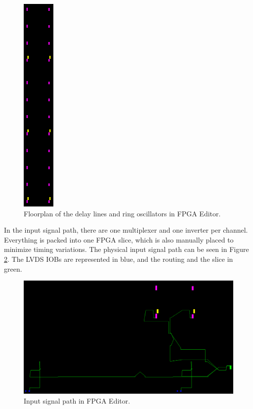 \documentclass[a4paper,11pt]{article}
\begin{document}
\begin{figure}[h]
\centering
\includegraphics[width=1.6cm]{floorplan.png}
\caption{Floorplan of the delay lines and ring oscillators in FPGA Editor.}
\label{fig:floorplan}
\end{figure}

In the input signal path, there are one multiplexer and one inverter per channel. Everything is packed into one FPGA slice, which is also manually placed to minimize timing variations. The physical input signal path can be seen in Figure \ref{fig:inputpath}. The LVDS IOBs are represented in blue, and the routing and the slice in green.

\begin{figure}[h]
\includegraphics[width=\textwidth]{input_routes.png}
\caption{Input signal path in FPGA Editor.}
\label{fig:inputpath}
\end{figure}
\end{document}
